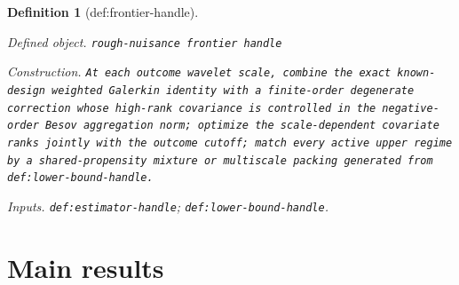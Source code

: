 \documentclass{article}
\newtheorem{definition}{Definition}
\begin{document}
\begin{definition}[def:frontier-handle]\label{def:frontier-handle}
\par\smallskip\noindent\emph{Defined object.} \texttt{rough-\allowbreak{}nuisance frontier handle}
\par\smallskip\noindent\emph{Construction.} \texttt{At each outcome wavelet scale,\allowbreak{} combine the exact known-\allowbreak{}design weighted Galerkin identity with a finite-\allowbreak{}order degenerate correction whose high-\allowbreak{}rank covariance is controlled in the negative-\allowbreak{}order Besov aggregation norm;\allowbreak{} optimize the scale-\allowbreak{}dependent covariate ranks jointly with the outcome cutoff;\allowbreak{} match every active upper regime by a shared-\allowbreak{}propensity mixture or multiscale packing generated from def:\allowbreak{}lower-\allowbreak{}bound-\allowbreak{}handle.}
\par\smallskip\noindent\emph{Inputs.} \texttt{def:\allowbreak{}estimator-\allowbreak{}handle}; \texttt{def:\allowbreak{}lower-\allowbreak{}bound-\allowbreak{}handle}.
\end{definition}

\section{Main results}
\end{document}
